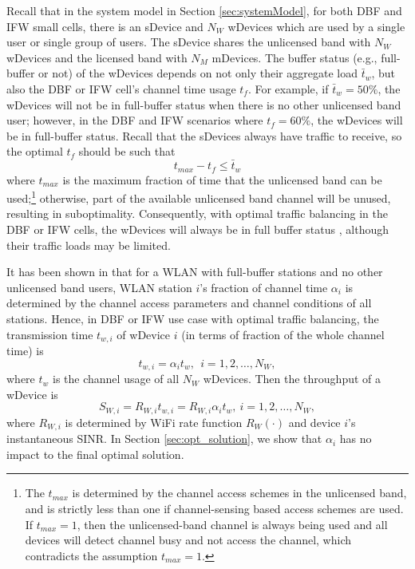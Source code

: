 \documentclass[journal,final,letterpaper,10pt,doublecolumn,twoside]{IEEEtran}
\begin{document}
Recall that in the system model in Section \ref{sec:systemModel},
for both DBF and IFW small cells, there is an sDevice and $N_W$ wDevices which are used by a single user or single group of users. The sDevice shares the unlicensed band with $N_W$ wDevices and the licensed band with $N_M$ mDevices.
The buffer status (e.g., full-buffer or not) of the wDevices depends on not only their aggregate load $\bar{t}_w$, but also the DBF or IFW cell's channel time usage $t_f$.   For example, if $\bar{t}_w=50\%$, the wDevices will not be in full-buffer status when there is no other unlicensed band user; however, in the DBF and IFW scenarios where $t_f=60\%$,  the wDevices will be in full-buffer status. Recall that the sDevices  always have traffic to receive, so the optimal $t_f$ should be such that
\begin{equation}
t_{max}-t_f \leq \bar{t}_w \label{eq:tmax-tf<twbar}
\end{equation}
where $t_{max}$ is
the maximum fraction of time that the unlicensed
band can be used;\footnote{The $t_{max}$ is determined by the channel
access schemes in the unlicensed band, and is strictly less than one
if channel-sensing based access schemes are used.  If
$t_{max}=1$, then the unlicensed-band channel is always being used
and all devices will detect channel busy and not access the channel,
which contradicts the assumption $t_{max}=1$.  } otherwise, part of the available unlicensed band channel will be unused, resulting in suboptimality. Consequently, with optimal traffic
balancing in the DBF or IFW cells, the wDevices will always be in full buffer status \cite{queuing-theory-textbook}, although their traffic loads may be limited.


It has been shown in
\cite{Bianchi,WiFi_modeling_Foh_freezingCounter,WiFi_analysis_freezingCounter_Lee2005Conf}  that for a WLAN with full-buffer stations and no other unlicensed band users,  WLAN station $i$'s fraction of channel time $\alpha_i$ is determined by the channel access parameters and channel conditions of all stations. Hence, in DBF or IFW use case with optimal traffic  balancing,  the transmission time $t_{w,i}$ of wDevice $i$ (in terms of fraction of the whole channel time) is
\begin{equation}
t_{w,i} = \alpha_i  t_w
, ~~ i=1,2,\dots,N_W,
\end{equation}
where $t_w$ is the channel usage of
all $N_W$ wDevices.
Then the throughput of a wDevice is
\begin{equation}
S_{W,i} = R_{W,i} t_{w,i}  = R_{W,i}\alpha_i  t_w  , ~ i=1,2,\dots,N_W ,   \label{eq:R_w}
\end{equation}
where $R_{W,i}$ is determined by WiFi rate function $R_W(\cdot)$ and
device $i$'s  instantaneous SINR. In Section \ref{sec:opt_solution}, we show that  $\alpha_i$ has no impact to the final optimal solution.
\end{document}
